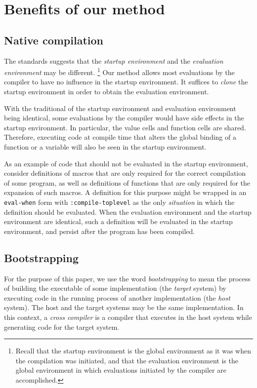 \section{Benefits of our method}
 
\subsection{Native compilation}

The \commonlisp{} standards suggests that the \emph{startup
  environment} and the \emph{evaluation environment} may be
different.%
\footnote{Recall that the startup environment is the global
environment as it was when the compilation was initiated, and that the
evaluation environment is the global environment in which evaluations
initiated by the compiler are accomplished.}
Our method allows most evaluations by the compiler to have no
influence in the startup environment.  It suffices to \emph{clone} the
startup environment in order to obtain the evaluation environment.

With the traditional of the startup environment and evaluation
environment being identical, some evaluations by the compiler would
have side effects in the startup environment.  In particular, the
value cells and function cells are shared.  Therefore, executing code
at compile time that alters the global binding of a function or a
variable will also be seen in the startup environment.

As an example of code that should not be evaluated in the startup
environment, consider definitions of macros that are only required for
the correct compilation of some program, as well as definitions of
functions that are only required for the expansion of such macros.  A
definition for this purpose might be wrapped in an \texttt{eval-when}
form with \texttt{:compile-toplevel} as the only \emph{situation} in
which the definition should be evaluated.  When the evaluation
environment and the startup environment are identical, such a
definition will be evaluated in the startup environment, and persist
after the program has been compiled.

\subsection{Bootstrapping}

For the purpose of this paper, we use the word \emph{bootstrapping} to
mean the process of building the executable of some implementation
(the \emph{target} system) by executing code in the running process of
another implementation (the \emph{host} system).  The host and the
target systems may be the same implementation.  In this context, a
\emph{cross compiler} is a compiler that executes in the host system
while generating code for the target system.

